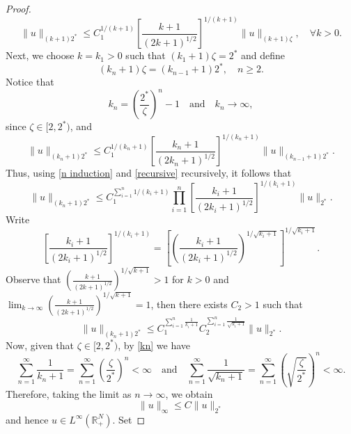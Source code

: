 \documentclass[12pt,reqno]{amsart}
\begin{document}
\begin{proof}
\begin{equation}\label{recursive}
    \|u\|_{(k+1) 2^\ast}\leq C_1^{1/(k+1)}\left[\frac{k+1}{(2k+1)^{1/2}}\right]^{1/(k+1)}\|u\|_{(k+1)\zeta},\quad \forall k>0.
\end{equation}
Next, we choose $k=k_1>0$ such that $(k_1+1)\zeta=2^\ast$ and define
$$
(k_{n}+1)\zeta=(k_{n-1}+1)2^\ast, \quad n\geq2.
$$
Notice that 
\begin{equation}\label{kn}
k_n=\left(\frac{2^\ast}{\zeta}\right)^n-1 \quad \text{and}\quad k_n \longrightarrow \infty,
\end{equation}
since $\zeta \in [2, 2^\ast)$, and 
\begin{equation}\label{n induction}
     \|u\|_{(k_n+1) 2^\ast}\leq C_1^{1/(k_n+1)}\left[\frac{k_n+1}{(2k_n+1)^{1/2}}\right]^{1/(k_n+1)}\|u\|_{(k_{n-1}+1) 2^\ast}.
\end{equation}
Thus, using \eqref{n induction} and \eqref{recursive} recursively, it follows that
\begin{equation*}
     \|u\|_{(k_n+1) 2^\ast}\leq C_1^{\sum_{i=1}^n1/(k_i+1)}\prod_{i=1}^n\left[\frac{k_i+1}{(2k_i+1)^{1/2}}\right]^{1/(k_i+1)}\|u\|_{ 2^\ast}.
\end{equation*}
Write
\begin{equation*}
    \left[\frac{k_i+1}{(2k_i+1)^{1/2}}\right]^{1/(k_i+1)}=\left[\left(\frac{k_i+1}{(2k_i+1)^{1/2}}\right)^{1/\sqrt{k_i+1}}\right]^{1/\sqrt{k_i+1}}.
\end{equation*}
Observe that $\left(\frac{k+1}{(2k+1)^{1/2}}\right)^{1/\sqrt{k+1}}>1$ for $k>0$ and $\displaystyle\lim_{k\longrightarrow \infty}\left(\frac{k+1}{(2k+1)^{1/2}}\right)^{1/\sqrt{k+1}}=1$, then there exists $C_2>1$ such that
\begin{equation*}
     \|u\|_{(k_n+1) 2^\ast}\leq C_1^{\sum_{i=1}^n\frac{1} {k_i+1}}C_2^{\sum_{i=1}^n\frac{1}{\sqrt{k_i+1}}}\|u\|_{ 2^\ast}.
\end{equation*}
Now, given that $\zeta\in [2, 2^\ast)$, by \eqref{kn} we have
\begin{equation*}
    \sum_{n=1}^\infty \frac{1}{k_n+1}= \sum_{n=1}^\infty \left(\frac{\zeta}{ 2^\ast}\right)^n<\infty \quad\text{and}\quad \sum_{n=1}^\infty \frac{1}{\sqrt{k_n+1}}=\sum_{n=1}^\infty \left(\sqrt{\frac{\zeta}{ 2^\ast}}\right)^n<\infty.
\end{equation*}
Therefore, taking the limit as $n\longrightarrow \infty$, we obtain
\begin{equation*}
    \|u\|_{\infty}\leq C \|u\|_{ 2^\ast}
\end{equation*}
and hence $u \in L^\infty(\mathds{R}^N_+)$. Set 

\end{proof}
\end{document}
